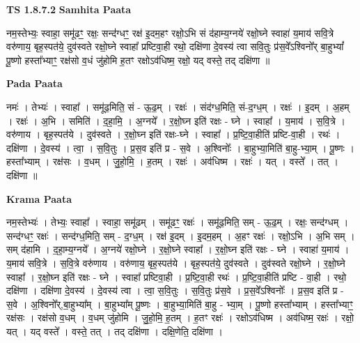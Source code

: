 \documentclass[17pt]{extarticle}
\begin{document}
\textbf{TS 1.8.7.2 } \newline
\textbf{Samhita Paata} \newline

नम॒स्तेभ्यः॒ स्वाहा॒ समू॑ढꣳ॒॒ रक्षः॒ सन्द॑॑ग्धꣳ॒॒ रक्ष॑ इ॒दम॒हꣳ रक्षो॒ऽभि सं द॑हाम्य॒ग्नये॑ रक्षो॒घ्ने स्वाहा॑ य॒माय॑ सवि॒त्रे वरु॑णाय॒ बृह॒स्पत॑ये॒ दुव॑स्वते रक्षो॒घ्ने स्वाहा᳚ प्रष्टिवा॒ही रथो॒ दक्षि॑णा दे॒वस्य॑ त्वा सवि॒तुः प्र॑स॒वे᳚ऽश्विनो᳚र् बा॒हुभ्यां᳚ पू॒ष्णो हस्ता᳚भ्याꣳ॒॒ रक्ष॑सो व॒धं जु॑होमि ह॒तꣳ रक्षोऽव॑धिष्म॒ रक्षो॒ यद् वस्ते॒ तद् दक्षि॑णा ॥ \newline

\textbf{Pada Paata} \newline

नमः॑ । तेभ्यः॑ । स्वाहा᳚ । समू॑ढ॒मिति॒ सं - ऊ॒ढ॒म् । रक्षः॑ । संद॑ग्ध॒मिति॒ सं-द॒ग्ध॒म् । रक्षः॑ । इ॒दम् । अ॒हम् । रक्षः॑ । अ॒भि । समिति॑ । द॒हा॒मि॒ । अ॒ग्नये᳚ । र॒क्षो॒घ्न इति॑ रक्षः - घ्ने । स्वाहा᳚ । य॒माय॑ । स॒वि॒त्रे । वरु॑णाय । बृह॒स्पत॑ये । दुव॑स्वते । र॒क्षो॒घ्न इति॑ रक्षः-घ्ने । स्वाहा᳚ । प्र॒ष्टि॒वा॒हीति॑ प्रष्टि-वा॒ही । रथः॑ । दक्षि॑णा । दे॒वस्य॑ । त्वा॒ । स॒वि॒तुः । प्र॒स॒व इति॑ प्र - स॒वे । अ॒श्विनोः᳚ । बा॒हुभ्या॒मिति॑ बा॒हु-भ्या॒म् । पू॒ष्णः । हस्ता᳚भ्याम् । रक्ष॑सः । व॒धम् । जु॒हो॒मि॒ । ह॒तम् । रक्षः॑ । अव॑धिष्म । रक्षः॑ । यत् । वस्ते᳚ । तत् । दक्षि॑णा ॥  \newline


\textbf{Krama Paata} \newline

नम॒स्तेभ्यः॑ । तेभ्यः॒ स्वाहा᳚ । स्वाहा॒ समू॑ढम् । समू॑ढꣳ॒॒ रक्षः॑ । समू॑ढ॒मिति॒ सम् - ऊ॒ढ॒म् । रक्षः॒ सन्द॑ग्धम् । सन्द॑ग्धꣳ॒॒ रक्षः॑ । सन्द॑ग्ध॒मिति॒ सम् - द॒ग्ध॒म् । रक्ष॑ इ॒दम् । इ॒दम॒हम् । अ॒हꣳ रक्षः॑ । रक्षो॒ऽभि । अ॒भि सम् । सम् द॑हामि । द॒हा॒म्य॒ग्नये᳚ । अ॒ग्नये॑ रक्षो॒घ्ने । र॒क्षो॒घ्ने स्वाहा᳚ । र॒क्षो॒घ्न इति॑ रक्षः - घ्ने । स्वाहा॑ य॒माय॑ । य॒माय॑ सवि॒त्रे । स॒वि॒त्रे वरु॑णाय । वरु॑णाय॒ बृह॒स्पत॑ये । बृह॒स्पत॑ये॒ दुव॑स्वते । दुव॑स्वते रक्षो॒घ्ने । र॒क्षो॒घ्ने स्वाहा᳚ । र॒क्षो॒घ्न इति॑ रक्षः - घ्ने । स्वाहा᳚ प्रष्टिवा॒ही । प्र॒ष्टि॒वा॒ही रथः॑ । प्र॒ष्टि॒वा॒हीति॑ प्रष्टि - वा॒ही । रथो॒ दक्षि॑णा । दक्षि॑णा दे॒वस्य॑ । दे॒वस्य॑ त्वा । त्वा॒ स॒वि॒तुः । स॒वि॒तुः प्र॑स॒वे । प्र॒स॒वे᳚ऽश्विनोः᳚ । प्र॒स॒व इति॑ प्र - स॒वे । अ॒श्विनो᳚र्,बा॒हुभ्या᳚म् । बा॒हुभ्या᳚म् पू॒ष्णः । बा॒हुभ्या॒मिति॑ बा॒हु - भ्या॒म् । पू॒ष्णो हस्ता᳚भ्याम् । हस्ता᳚भ्याꣳ॒॒ रक्ष॑सः । रक्ष॑सो व॒धम् । व॒धम् जु॑होमि । जु॒हो॒मि॒ ह॒तम् । ह॒तꣳ रक्षः॑ । रक्षोऽव॑धिष्म । अव॑धिष्म॒ रक्षः॑ । रक्षो॒ यत् । यद् वस्ते᳚ । वस्ते॒ तत् । तद् दक्षि॑णा । दक्षि॒णेति॒ दक्षि॑णा । \newline
\end{document}
